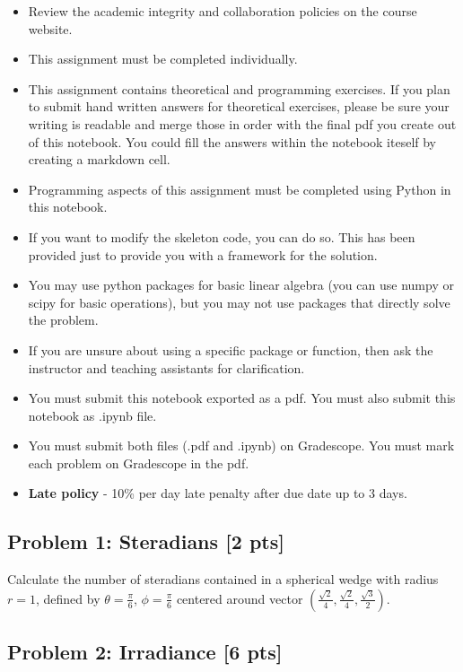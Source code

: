 \documentclass[11pt]{article}
\providecommand{\tightlist}{%
      \setlength{\itemsep}{0pt}\setlength{\parskip}{0pt}}
\begin{document}
\begin{itemize}
\tightlist
\item
  Review the academic integrity and collaboration policies on the course
  website.
\item
  This assignment must be completed individually.
\item
  This assignment contains theoretical and programming exercises. If you
  plan to submit hand written answers for theoretical exercises, please
  be sure your writing is readable and merge those in order with the
  final pdf you create out of this notebook. You could fill the answers
  within the notebook iteself by creating a markdown cell.
\item
  Programming aspects of this assignment must be completed using Python
  in this notebook.
\item
  If you want to modify the skeleton code, you can do so. This has been
  provided just to provide you with a framework for the solution.
\item
  You may use python packages for basic linear algebra (you can use
  numpy or scipy for basic operations), but you may not use packages
  that directly solve the problem.
\item
  If you are unsure about using a specific package or function, then ask
  the instructor and teaching assistants for clarification.
\item
  You must submit this notebook exported as a pdf. You must also submit
  this notebook as .ipynb file.
\item
  You must submit both files (.pdf and .ipynb) on Gradescope. You must
  mark each problem on Gradescope in the pdf.
\item
  \textbf{Late policy} - 10\% per day late penalty after due date up to
  3 days.
\end{itemize}

    \hypertarget{problem-1-steradians-2-pts}{%
\subsection{Problem 1: Steradians {[}2
pts{]}}\label{problem-1-steradians-2-pts}}

Calculate the number of steradians contained in a spherical wedge with
radius \(r = 1\), defined by \(\theta=\frac{\pi}{6}\),
\(\phi=\frac{\pi}{6}\) centered around vector
\((\frac{\sqrt{2}}{4}, \frac{\sqrt{2}}{4}, \frac{\sqrt{3}}{2})\). 

    \hypertarget{problem-2-irradiance-6-pts}{%
\subsection{Problem 2: Irradiance {[}6
pts{]}}\label{problem-2-irradiance-6-pts}}
\end{document}
